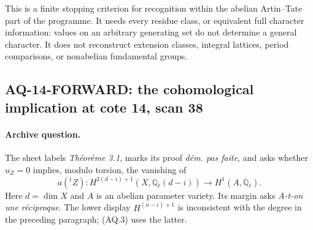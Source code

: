 \documentclass[11pt,a4paper]{article}
\theoremstyle{definition}\newtheorem{definition}[theorem]{Definition}
\theoremstyle{remark}\newtheorem{remark}[theorem]{Remark}
\begin{document}
This is a finite stopping criterion for recognition within the
abelian Artin--Tate part of the programme. It needs every residue
class, or equivalent full character information: values on an
arbitrary generating set do not determine a general character.
It does not reconstruct extension classes, integral lattices,
period comparisons, or nonabelian fundamental groups.

\subsection{AQ-14-FORWARD: the cohomological implication at cote 14, scan 38}
\paragraph{Archive question.}
The sheet labels \emph{Th\'eor\`eme 3.1}, marks its proof
\emph{d\'em. pas faite}, and asks whether $u_Z=0$ implies,
modulo torsion, the vanishing of
\[
 a({}^tZ):H^{2(d-i)+1}(X,\mathbb Q_\ell(d-i))
                     \longrightarrow H^1(A,\mathbb Q_\ell).
                                                               \tag{AQ.3}
\]
Here $d=\dim X$ and $A$ is an abelian parameter variety.
Its margin asks \emph{A-t-on une r\'eciproque}.
The lower display $H^{(n-i)+1}$ is inconsistent with the
degree in the preceding paragraph; (AQ.3) uses the latter.
\end{document}
